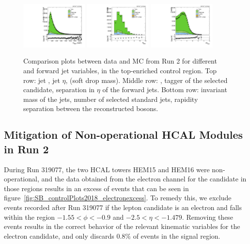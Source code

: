 \begin{figure}[htbp]
  \includegraphics[width=0.3\textwidth]{fig/controlPlots/CR_b1_allL_allP_allC_allD_Run2_lnujj_vbfMass.pdf}
  \includegraphics[width=0.3\textwidth]{fig/controlPlots/CR_b1_allL_allP_allC_allD_Run2_lnujj_nJets.pdf}
  \includegraphics[width=0.3\textwidth]{fig/controlPlots/CR_b1_allL_allP_allC_allD_Run2_dy.pdf}\\
  \caption{
    Comparison plots between data and MC from Run 2 for different \Vhad and \VBF forward jet variables, in the top-enriched control region.
    Top row: jet \pt, jet $\eta$, \MJ (soft drop mass).
    Middle row: \nsubjDDT, \DoubleB tagger of the selected \Vhad candidate, separation in $\eta$ of the \VBF forward jets.
    Bottom row: invariant mass of the \VBF jets, number of selected standard jets, rapidity separation between the reconstructed bosons.
  }
  \label{fig:CR_controlPlotsRun2_2}
\end{figure}

\clearpage
\subsection{Mitigation of Non-operational HCAL Modules in Run 2}

During Run 319077, the two HCAL towers HEM15 and HEM16 were non-operational, and the data obtained from the electron channel for the \Wtolnu candidate in those regions results in an excess of events that can be seen in figure~\ref{fig:SB_controlPlots2018_electronexcess}.
To remedy this, we exclude events recorded after Run 319077 if the lepton candidate is an electron and falls within the region $-1.55<\phi<-0.9$ and $-2.5<\eta<-1.479$.
Removing these events results in the correct behavior of the relevant kinematic variables for the electron candidate, and only discards 0.8\% of events in the signal region.

